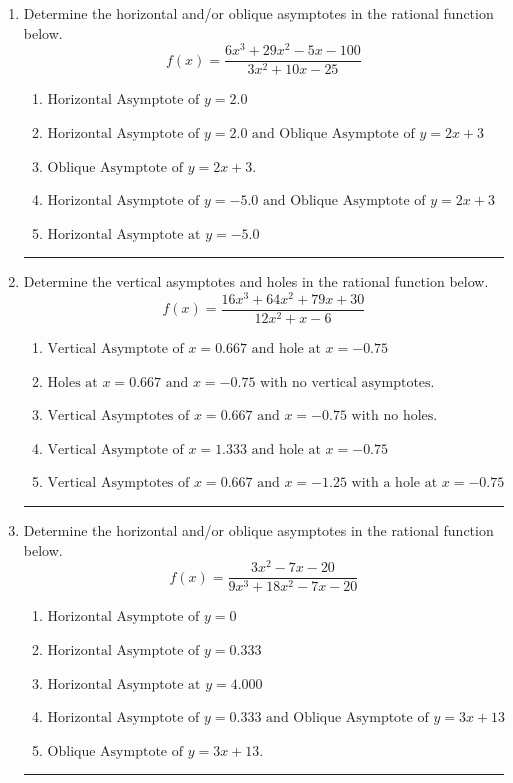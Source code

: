 \documentclass[14pt]{extbook}
\newcommand{\litem}[1]{\item#1\hspace*{-1cm}\rule{\textwidth}{0.4pt}}
\begin{document}
\begin{enumerate}
\litem{
Determine the horizontal and/or oblique asymptotes in the rational function below.\[ f(x) = \frac{6x^{3} +29 x^{2} -5 x -100}{3x^{2} +10 x -25} \]\begin{enumerate}[label=\Alph*.]
\item \( \text{Horizontal Asymptote of } y = 2.0  \)
\item \( \text{Horizontal Asymptote of } y = 2.0 \text{ and Oblique Asymptote of } y = 2x + 3 \)
\item \( \text{Oblique Asymptote of } y = 2x + 3. \)
\item \( \text{Horizontal Asymptote of } y = -5.0 \text{ and Oblique Asymptote of } y = 2x + 3 \)
\item \( \text{Horizontal Asymptote at } y = -5.0 \)

\end{enumerate} }
\litem{
Determine the vertical asymptotes and holes in the rational function below.\[ f(x) = \frac{16x^{3} +64 x^{2} +79 x + 30}{12x^{2} +x -6} \]\begin{enumerate}[label=\Alph*.]
\item \( \text{Vertical Asymptote of } x = 0.667 \text{ and hole at } x = -0.75 \)
\item \( \text{Holes at } x = 0.667 \text{ and } x = -0.75 \text{ with no vertical asymptotes.} \)
\item \( \text{Vertical Asymptotes of } x = 0.667 \text{ and } x = -0.75 \text{ with no holes.} \)
\item \( \text{Vertical Asymptote of } x = 1.333 \text{ and hole at } x = -0.75 \)
\item \( \text{Vertical Asymptotes of } x = 0.667 \text{ and } x = -1.25 \text{ with a hole at } x = -0.75 \)

\end{enumerate} }
\litem{
Determine the horizontal and/or oblique asymptotes in the rational function below.\[ f(x) = \frac{3x^{2} -7 x -20}{9x^{3} +18 x^{2} -7 x -20} \]\begin{enumerate}[label=\Alph*.]
\item \( \text{Horizontal Asymptote of } y = 0 \)
\item \( \text{Horizontal Asymptote of } y = 0.333  \)
\item \( \text{Horizontal Asymptote at } y = 4.000 \)
\item \( \text{Horizontal Asymptote of } y = 0.333 \text{ and Oblique Asymptote of } y = 3x + 13 \)
\item \( \text{Oblique Asymptote of } y = 3x + 13. \)


\end{enumerate}}
\end{enumerate}
\end{document}
